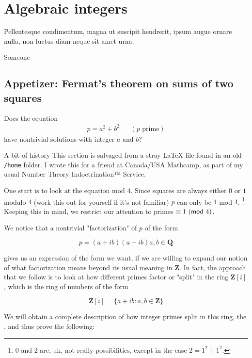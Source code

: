 \chapter{Algebraic integers}

\epigraph{Pellentesque condimentum, magna ut suscipit hendrerit, ipsum augue
  ornare nulla, non luctus diam neque sit amet urna.}{Someone}

\section{Appetizer: Fermat's theorem on sums of two squares}%
\label{sec:appetizer-fermats-theorem-on-sums-of-two-squares}

\begin{question}
  Does the equation
  \begin{align}p = a ^ 2 + b ^ 2 &&(p \text{ prime})\end{align} have nontrivial
  solutions with integer \(a\) and \(b\)?
\end{question}

\begin{paragraph}{A bit of history}
  This section is salvaged from a stray {\LaTeX} file found in
  an old \texttt{/home} folder. I wrote this for a friend at Canada/USA
  Mathcamp, as part of my usual Number Theory Indoctrination™ Service.
\end{paragraph}

\medskip\noindent
One start is to look at the equation mod \(4\). Since squares
are always either \(0\) or \(1\) modulo \(4\) (work this out for yourself if
it's not familiar) \(p\) can only be \(1\) mod \(4\). \footnote{\(0\) and \(2\)
  are, uh, not really possibilities, except in the case \(2 = 1^2 + 1^2\).}
Keeping this in mind, we restrict our attention to primes \(\equiv 1\ (\mathsf{mod}\ 4)\).

We notice that a nontrivial "factorization" of \(p\) of the form

\[p=(a+ib)(a-ib) a, b\in{\mathbf Q}\]

gives us an expression of the form we want, if we are willing to expand our
notion of what factorization means beyond its usual meaning in \({\mathbf Z}\).
In fact, the approach that we follow is to look at how different primes factor
or "split" in the ring \({\mathbf Z}[i]\), which is the ring of numbers of the
form

\[ {\mathbf Z}[i] = \{a+ib : a, b\in{\mathbf Z}\} \]

We will obtain a complete description of how integer primes split in this ring,
the , and thus prove the following:

